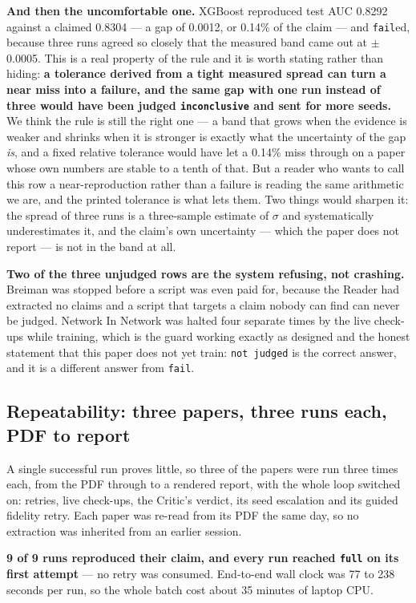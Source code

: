 \documentclass[10pt,twocolumn]{article}
\begin{document}
\textbf{And then the uncomfortable one.} XGBoost reproduced test AUC 0.8292 against a claimed
0.8304 --- a gap of 0.0012, or 0.14\% of the claim --- and \texttt{fail}ed, because three runs
agreed so closely that the measured band came out at $\pm$0.0005. This is a real property of the
rule and it is worth stating rather than hiding: \textbf{a tolerance derived from a tight
measured spread can turn a near miss into a failure, and the same gap with one run instead of
three would have been judged \texttt{inconclusive} and sent for more seeds.} We think the rule is
still the right one --- a band that grows when the evidence is weaker and shrinks when it is
stronger is exactly what the uncertainty of the gap \emph{is}, and a fixed relative tolerance
would have let a 0.14\% miss through on a paper whose own numbers are stable to a tenth of
that. But a reader who wants to call this row a near-reproduction rather than a failure is
reading the same arithmetic we are, and the printed tolerance is what lets them. Two things
would sharpen it: the spread of three runs is a three-sample estimate of $\sigma$ and
systematically underestimates it, and the claim's own uncertainty --- which the paper does not
report --- is not in the band at all.

\textbf{Two of the three unjudged rows are the system refusing, not crashing.} Breiman was
stopped before a script was even paid for, because the Reader had extracted no claims and a
script that targets a claim nobody can find can never be judged. Network In Network was halted
four separate times by the live check-ups while training, which is the guard working exactly as
designed and the honest statement that this paper does not yet train: \texttt{not judged} is the
correct answer, and it is a different answer from \texttt{fail}.

\subsection{Repeatability: three papers, three runs each, PDF to report}
\label{sec:repeat}

A single successful run proves little, so three of the papers were run three times each, from the
PDF through to a rendered report, with the whole loop switched on: retries, live check-ups, the
Critic's verdict, its seed escalation and its guided fidelity retry. Each paper was re-read from
its PDF the same day, so no extraction was inherited from an earlier session.

\textbf{9 of 9 runs reproduced their claim, and every run reached \texttt{full} on its first
attempt} --- no retry was consumed. End-to-end wall clock was 77 to 238 seconds per run, so the
whole batch cost about 35 minutes of laptop CPU.
\end{document}
